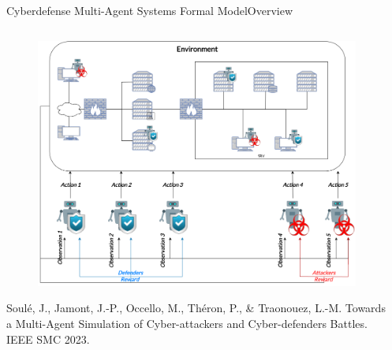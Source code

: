 \begin{frame}{Cyberdefense Multi-Agent Systems Formal Model}{Overview}

    \begin{columns}

        \hspace{-2ex}

        \begin{column}{0.45\textwidth}

            \begin{figure}
                \includegraphics[width=\linewidth]{figures/marl_illustration.png}
            \end{figure}

            {\tiny \begin{spacing}{0.5}
                Soulé, J., Jamont, J.-P., Occello, M., Théron, P., \& Traonouez, L.-M. Towards a Multi-Agent Simulation of Cyber-attackers and Cyber-defenders Battles. IEEE SMC 2023.
            \end{spacing}}

        \end{column}

        \begin{column}{0.65\textwidth}
            \vspace{-2ex}


\end{column}
\end{columns}
\end{frame}
